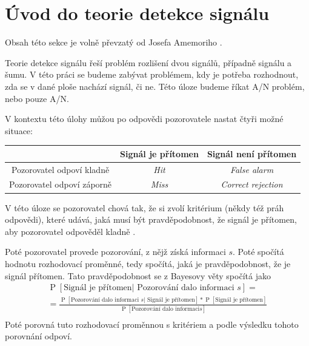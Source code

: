 \section{Úvod do teorie detekce signálu}

Obsah této sekce je volně převzatý od Josefa Amemoriho \citeyearpar{Pepa}.

Teorie detekce signálu řeší problém rozlišení dvou signálů, případně signálu a
šumu. V této práci se budeme zabývat problémem, kdy je potřeba rozhodnout, zda
se v dané ploše nachází signál, či ne. Této úloze budeme říkat A/N problém,
nebo pouze A/N.

V kontextu této úlohy můžou po odpovědi pozorovatele nastat čtyři možné situace:

\bigskip\noindent
\begin{center}
\begin{tabular}{ccc}
\hline
\hline
& Signál je přítomen & Signál není přítomen \\
\hline
Pozorovatel odpoví kladně &{\it Hit}&{\it False alarm} \\
Pozorovatel odpoví záporně &{\it Miss}&{\it Correct rejection}\\
\hline
\hline
\end{tabular}
\end{center}
\bigskip

 V této úloze se pozorovatel chová tak,
že si zvolí kritérium (někdy též práh odpovědi), které udává, jaká musí být
pravděpodobnost, že signál je přítomen, aby pozorovatel odpověděl kladně \citep[kapitola 1.7]{GreenSDT}.

\def\P#1{\operatorname{P}\left[#1\right]}
\def\E#1{\mathbb{E}\left[#1\right]}
\def\tP#1{\P{\text{#1}}}

Poté pozorovatel provede pozorování, z nějž získá informaci $s$. Poté spočítá
hodnotu rozhodovací proměnné, tedy spočítá, jaká je pravděpodobnost, že je
signál přítomen. Tato pravděpodobnost se z Bayesovy věty spočítá jako 
\begin{multline*}
\tP{Signál je přítomen| Pozorování dalo informaci $s$} = \\ 
=\frac{\tP{Pozorování dalo informaci $s$
| Signál je přítomen}*\tP{Signál je přítomen}}{\tP{Pozorování dalo informaci
$s$}}\\ \end{multline*}
Poté porovná tuto rozhodovací proměnnou s kritériem a podle výsledku tohoto
porovnání odpoví.


